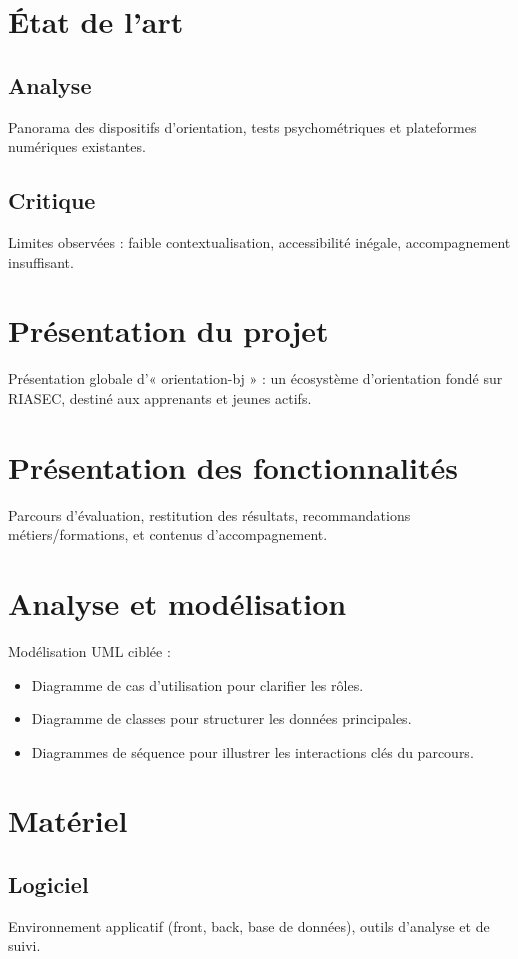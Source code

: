 \documentclass[12pt,a4paper]{report}
\begin{document}
\section{État de l’art}
\subsection*{Analyse}
Panorama des dispositifs d’orientation, tests psychométriques et plateformes numériques existantes.
\subsection*{Critique}
Limites observées : faible contextualisation, accessibilité inégale, accompagnement insuffisant.

\section{Présentation du projet}
Présentation globale d’« orientation-bj » : un écosystème d’orientation fondé sur RIASEC, destiné aux apprenants et jeunes actifs.

\section{Présentation des fonctionnalités}
Parcours d’évaluation, restitution des résultats, recommandations métiers/formations, et contenus d’accompagnement.

\section{Analyse et modélisation}
Modélisation UML ciblée :
\begin{itemize}
    \item Diagramme de cas d’utilisation pour clarifier les rôles.
    \item Diagramme de classes pour structurer les données principales.
    \item Diagrammes de séquence pour illustrer les interactions clés du parcours.
\end{itemize}

\section{Matériel}
\subsection*{Logiciel}
Environnement applicatif (front, back, base de données), outils d’analyse et de suivi.
\end{document}
